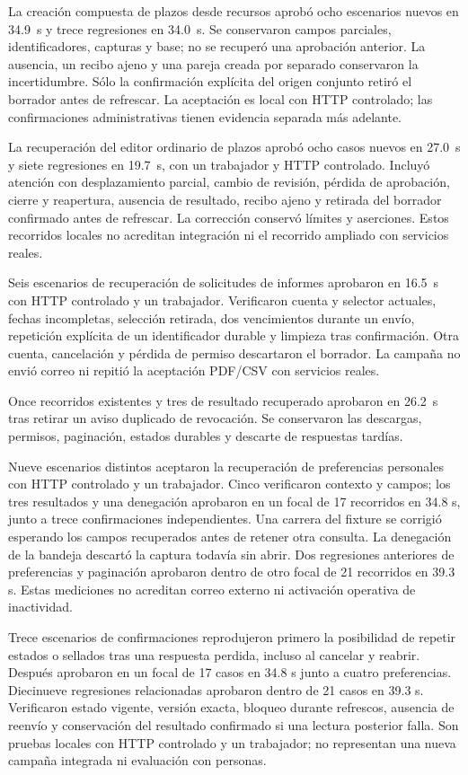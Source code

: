 La creación compuesta de plazos desde recursos aprobó ocho escenarios nuevos
en 34.9~s y trece regresiones en 34.0~s. Se conservaron campos parciales,
identificadores, capturas y base; no se recuperó una aprobación anterior.
La ausencia, un recibo ajeno y una pareja creada por separado conservaron la
incertidumbre. Sólo la confirmación explícita del origen conjunto retiró el
borrador antes de refrescar. La aceptación es local con HTTP controlado; las
confirmaciones administrativas tienen evidencia separada más adelante.

La recuperación del editor ordinario de plazos aprobó ocho casos nuevos en
27.0~s y siete regresiones en 19.7~s, con un trabajador y HTTP controlado.
Incluyó atención con desplazamiento parcial, cambio de revisión, pérdida de
aprobación, cierre y reapertura, ausencia de resultado, recibo ajeno y retirada
del borrador confirmado antes de refrescar. La corrección conservó límites y
aserciones. Estos recorridos locales no acreditan integración ni el recorrido
ampliado con servicios reales.

Seis escenarios de recuperación de solicitudes de informes aprobaron en 16.5~s
con HTTP controlado y un trabajador. Verificaron cuenta y selector actuales,
fechas incompletas, selección retirada, dos vencimientos durante un envío,
repetición explícita de un identificador durable y limpieza tras confirmación.
Otra cuenta, cancelación y pérdida de permiso descartaron el borrador. La
campaña no envió correo ni repitió la aceptación PDF/CSV con servicios reales.

Once recorridos existentes y tres de resultado recuperado aprobaron en 26.2~s
tras retirar un aviso duplicado de revocación. Se conservaron las descargas,
permisos, paginación, estados durables y descarte de respuestas tardías.

Nueve escenarios distintos aceptaron la recuperación de preferencias personales
con HTTP controlado y un trabajador. Cinco verificaron contexto y campos;
los tres resultados y una denegación aprobaron en un focal de 17 recorridos
en 34.8 s, junto a trece confirmaciones independientes. Una carrera del fixture
se corrigió esperando los campos recuperados antes de retener otra consulta.
La denegación de la bandeja descartó la captura todavía sin abrir. Dos regresiones
anteriores de preferencias y paginación aprobaron dentro de otro focal de
21 recorridos en 39.3 s. Estas mediciones no acreditan correo externo ni
activación operativa de inactividad.

Trece escenarios de confirmaciones reprodujeron primero la posibilidad de repetir
estados o sellados tras una respuesta perdida, incluso al cancelar y reabrir.
Después aprobaron en un focal de 17 casos en 34.8 s junto a cuatro preferencias.
Diecinueve regresiones relacionadas aprobaron dentro de 21 casos en 39.3 s.
Verificaron estado vigente, versión exacta, bloqueo durante refrescos, ausencia
de reenvío y conservación del resultado confirmado si una lectura posterior
falla. Son pruebas locales con HTTP controlado y un trabajador; no representan
una nueva campaña integrada ni evaluación con personas.

